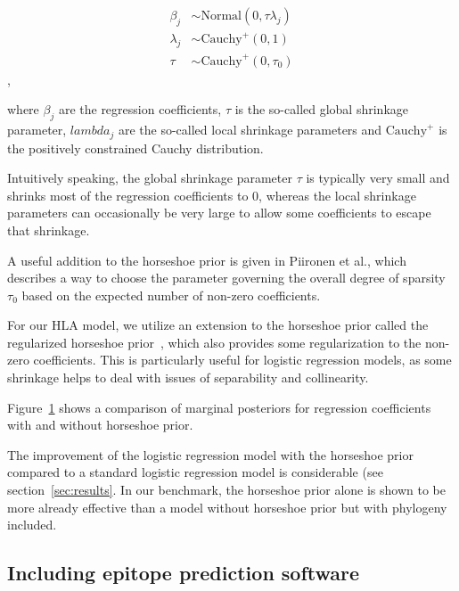\documentclass[fleqn,11pt]{SelfArx} %
\begin{document}
\begin{equation}
  \begin{aligned}
    \beta_{j} &\sim \text{Normal}(0, \tau\lambda_{j}) \\
    \lambda_{j} &\sim \text{Cauchy}^{+}(0, 1) \\
    \tau &\sim \text{Cauchy}^{+}(0, \tau_{0})
  \end{aligned}
\end{equation},

where \(\beta_{j}\) are the regression coefficients, \(\tau\) is the so-called global shrinkage parameter, \(lambda_{j}\) are the so-called local shrinkage parameters and \(\text{Cauchy}^{+}\) is the positively constrained Cauchy distribution.

Intuitively speaking, the global shrinkage parameter \(\tau\) is typically very small and shrinks most of the regression coefficients to 0, whereas the local shrinkage parameters can occasionally be very large to allow some coefficients to escape that shrinkage.

A useful addition to the horseshoe prior is given in Piironen et al.\cite{Piironen2017}, which describes a way to choose the parameter governing the overall degree of sparsity \(\tau_{0}\) based on the expected number of non-zero coefficients. 

For our HLA model, we utilize an extension to the horseshoe prior called the regularized horseshoe prior~\cite{Piironen2017}, which also provides some regularization to the non-zero coefficients. This is particularly useful for logistic regression models, as some shrinkage helps to deal with issues of separability and collinearity.

Figure~\ref{fig:horseshoe-comparison} shows a comparison of marginal posteriors for regression coefficients with and without horseshoe prior.

The improvement of the logistic regression model with the horseshoe prior compared to a standard logistic regression model is considerable (see section~\ref{sec:results}. In our benchmark, the horseshoe prior alone is shown to be more already effective than a model without horseshoe prior but with phylogeny included.

\begin{figure}
  \label{fig:horseshoe-comparison}
\end{figure}

\subsection*{Including epitope prediction software}
\end{document}
